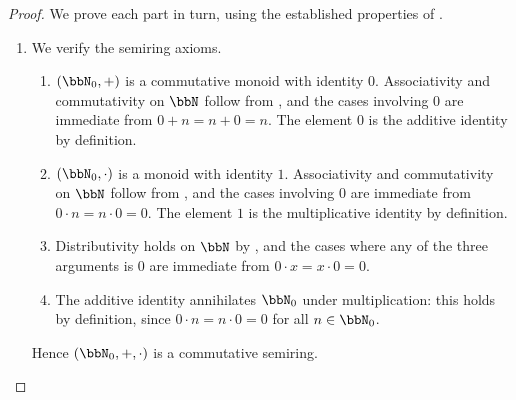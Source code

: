\begin{proof}
    We prove each part in turn, using the established properties of .

    \begin{enumerate}
        \item We verify the semiring axioms.
        \begin{enumerate}
            \item $(\bbN_0, +)$ is a commutative monoid with identity $0$. Associativity and commutativity on $\bbN$ follow from , and the cases involving $0$ are immediate from $0 + n = n + 0 = n$. The element $0$ is the additive identity by definition.

            \item $(\bbN_0, \cdot)$ is a monoid with identity $1$. Associativity and commutativity on $\bbN$ follow from , and the cases involving $0$ are immediate from $0 \cdot n = n \cdot 0 = 0$. The element $1$ is the multiplicative identity by definition.

            \item Distributivity holds on $\bbN$ by , and the cases where any of the three arguments is $0$ are immediate from $0 \cdot x = x \cdot 0 = 0$.

            \item The additive identity annihilates $\bbN_0$ under multiplication: this holds by definition, since $0 \cdot n = n \cdot 0 = 0$ for all $n \in \bbN_0$.
        \end{enumerate}
        Hence $(\bbN_0, +, \cdot)$ is a commutative semiring.


\end{enumerate}
\end{proof}
